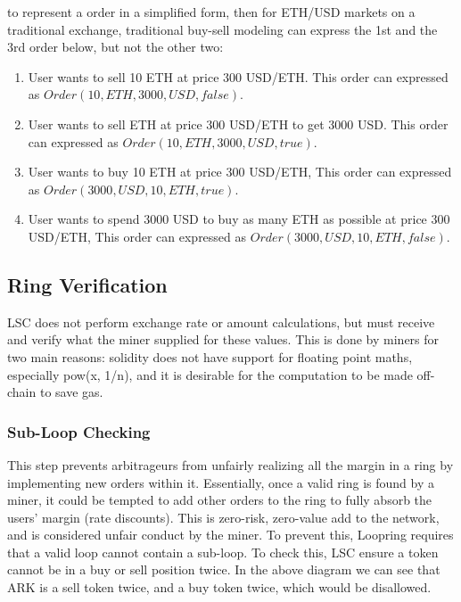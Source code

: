 \documentclass[UTF8,nofonts]{article}
\begin{document}
to represent a order in a simplified form, then for ETH/USD markets on a traditional exchange, traditional buy-sell modeling can express the 1st and the 3rd order below, but not the other two:

\begin{enumerate}
	\item User wants to sell 10 ETH at price 300 USD/ETH. This order can expressed as $Order(10, ETH, 3000, USD, false)$.
	\item User wants to sell ETH at price 300 USD/ETH to get 3000 USD. This order can expressed as $Order(10, ETH, 3000, USD, true)$.
	\item User wants to buy 10 ETH at price 300 USD/ETH, This order can expressed as $Order(3000, USD, 10, ETH, true)$.
	\item User wants to spend 3000 USD to buy as many ETH as possible at price 300 USD/ETH, This order can expressed as $Order(3000, USD, 10, ETH, false)$.
\end{enumerate}





\subsection{Ring Verification}

LSC does not perform exchange rate or amount calculations, but must receive and verify what the miner supplied for these values. This is done by miners for two main reasons: solidity does not have support for floating point maths, especially pow(x, 1/n), and it is desirable for the computation to be made off-chain to save gas.

\subsubsection{Sub-Loop Checking}
This step prevents arbitrageurs from unfairly realizing all the margin in a ring by implementing new orders within it. Essentially, once a valid ring is found by a miner, it could be tempted to add other orders to the ring to fully absorb the users' margin (rate discounts). This is zero-risk, zero-value add to the network, and is considered unfair conduct by the miner. To prevent this, Loopring requires that a valid loop cannot contain a sub-loop. To check this, LSC ensure a token cannot be in a buy or sell position twice. In the above diagram we can see that ARK is a sell token twice, and a buy token twice, which would be disallowed. 
\end{document}
